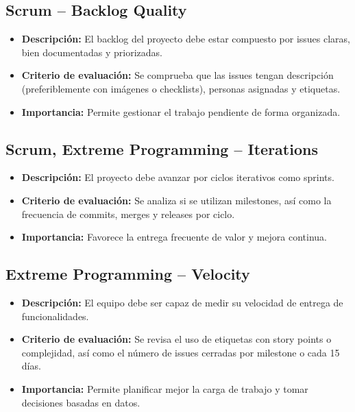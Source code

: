 \subsection{Scrum – Backlog Quality}

\begin{itemize}
  \item \textbf{Descripción:} El backlog del proyecto debe estar compuesto por issues claras, bien documentadas y priorizadas.
  \item \textbf{Criterio de evaluación:} Se comprueba que las issues tengan descripción (preferiblemente con imágenes o checklists), personas asignadas y etiquetas.
  \item \textbf{Importancia:} Permite gestionar el trabajo pendiente de forma organizada.
\end{itemize}

\subsection{Scrum, Extreme Programming – Iterations}

\begin{itemize}
  \item \textbf{Descripción:} El proyecto debe avanzar por ciclos iterativos como sprints.
  \item \textbf{Criterio de evaluación:} Se analiza si se utilizan milestones, así como la frecuencia de commits, merges y releases por ciclo.
  \item \textbf{Importancia:} Favorece la entrega frecuente de valor y mejora continua.
\end{itemize}

\subsection{Extreme Programming – Velocity}

\begin{itemize}
  \item \textbf{Descripción:} El equipo debe ser capaz de medir su velocidad de entrega de funcionalidades.
  \item \textbf{Criterio de evaluación:} Se revisa el uso de etiquetas con story points o complejidad, así como el número de issues cerradas por milestone o cada 15 días.
  \item \textbf{Importancia:} Permite planificar mejor la carga de trabajo y tomar decisiones basadas en datos.
\end{itemize}

